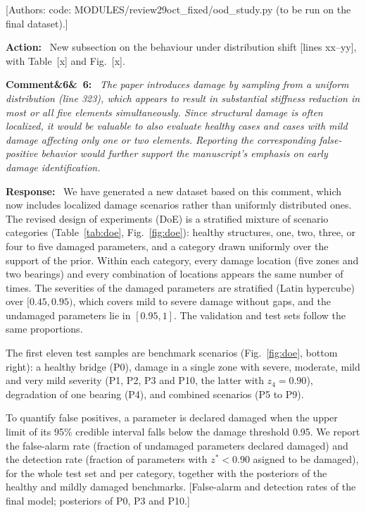 \documentclass[11pt]{article}
\newenvironment{rcomment}[1]{\par\bigskip\noindent\textbf{Comment\ifx&#1&\else\ #1\fi:}\ \itshape}{\par}
\newenvironment{response}{\par\smallskip\noindent\color{resp}\textbf{Response:}\ }{\par}
\newenvironment{action}{\par\smallskip\noindent\color{resp}\textbf{Action:}\ }{\par}
\newcommand{\authornote}[1]{\textcolor{note}{\textsf{[Authors: #1]}}}
\newcommand{\tbd}[1]{\textcolor{note}{\textsf{[#1]}}}
\newcommand{\lines}[1]{\tbd{lines #1}}
\begin{document}
\authornote{code: MODULES/review29oct\_fixed/ood\_study.py (to be run on the final dataset).}

\begin{action}
New subsection on the behaviour under distribution shift \lines{xx--yy}, with Table~\tbd{x} and Fig.~\tbd{x}.
\end{action}

\begin{rcomment}{6}
The paper introduces damage by sampling from a uniform distribution (line 323), which appears to result in substantial
stiffness reduction in most or all five elements simultaneously. Since structural damage is often localized, it would be
valuable to also evaluate healthy cases and cases with mild damage affecting only one or two elements. Reporting the
corresponding false-positive behavior would further support the manuscript's emphasis on early damage identification.
\end{rcomment}

\begin{response}
We have generated a new dataset based on this comment, which now includes localized damage scenarios rather than uniformly distributed ones. 
The revised design of experiments (DoE) is a stratified mixture of scenario categories
(Table~\ref{tab:doe}, Fig.~\ref{fig:doe}): healthy structures, one, two, three, or four to five damaged parameters, and a category drawn uniformly over the support of the prior. 
Within each category, every damage location (five zones and two bearings) and every combination of locations appears the same number of times.
The severities of the damaged parameters are stratified (Latin hypercube) over $[0.45,0.95)$, which covers mild to severe damage without gaps, and
the undamaged parameters lie in $[0.95,1]$. 
The validation and test sets follow the same proportions.

The first eleven test samples are benchmark scenarios (Fig.~\ref{fig:doe}, bottom right): a healthy bridge (P0),
damage in a single zone with severe, moderate, mild and very mild severity (P1, P2, P3 and P10, the latter with
$z_4=0.90$), degradation of one bearing (P4), and combined scenarios (P5 to P9).

To quantify false positives, a parameter is declared damaged when the upper limit of its 95\% credible interval falls below the damage threshold 0.95. We report the false-alarm rate (fraction of undamaged parameters declared damaged) and the detection rate (fraction of parameters with $z^*<0.90$ asigned to be damaged), for the whole test set and per category, together with the posteriors of the healthy and mildly damaged benchmarks.
\tbd{False-alarm and detection rates of the final model; posteriors of P0, P3 and P10.}
\end{response}
\end{document}
